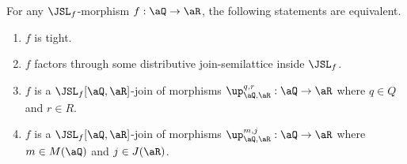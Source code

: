 \documentclass{article}
\begin{document}
\begin{lemma}
\label{lem:tight_mor_char}
\item
For any $\JSL_f$-morphism $f : \aQ \to \aR$, the following statements are equivalent.
\begin{enumerate}
\item
$f$ is tight.
\item
$f$ factors through some distributive join-semilattice inside $\JSL_f$.
\item
$f$ is a $\JSL_f[\aQ,\aR]$-join of morphisms $\up_{\aQ,\aR}^{q,r} : \aQ \to \aR$ where $q \in Q$ and $r \in R$.
\item
$f$ is a $\JSL_f[\aQ,\aR]$-join of morphisms $\up_{\aQ,\aR}^{m,j} : \aQ \to \aR$ where $m \in M(\aQ)$ and $j \in J(\aR)$.

\end{enumerate}
\end{lemma}
\end{document}
